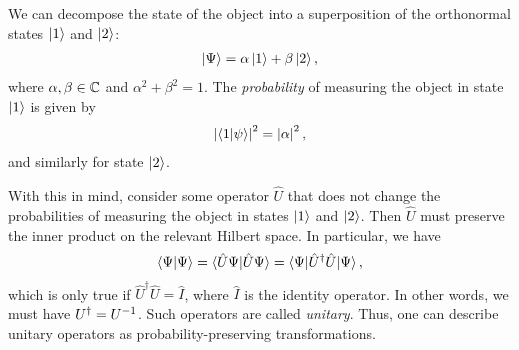 We can decompose the state of the object into a superposition of the orthonormal states $\ket{1}$ and $\ket{2}$:
\begin{align*}
    \ket{\Psi} = \alpha\ket{1} + \beta\ket{2},
\end{align*}
where $\alpha,\beta\in\mathbb{C}$ and $\alpha^2+\beta^2=1$. The \textit{probability} of measuring the object in state $\ket{1}$ is given by
\begin{align*}
    \left|\braket{1|\psi}\right|^2 = \left|\alpha\right|^2,
\end{align*}
and similarly for state $\ket{2}$.

With this in mind, consider some operator $\hat{U}$ that does not change the probabilities of measuring the object in states $\ket{1}$ and $\ket{2}$. Then $\hat{U}$ must preserve the inner product on the relevant Hilbert space. In particular, we have
\begin{align*}
    \braket{\Psi|\Psi} = \braket{\hat{U}\Psi|\hat{U}\Psi} = \braket{\Psi|\hat{U}^\dagger\hat{U}|\Psi},
\end{align*}
which is only true if $\hat{U}^\dagger\hat{U}=\hat{I}$, where $\hat{I}$ is the identity operator. In other words, we must have $U^\dagger = { U }^{-1}$. Such operators are called \textit{unitary}. Thus, one can describe unitary operators as probability-preserving transformations.

